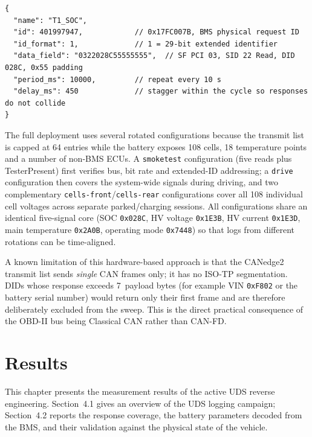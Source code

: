 \documentclass[11pt,a4paper,oneside,parskip=half]{scrreprt}
\providecommand{\hex}{}\renewcommand{\hex}[1]{\texttt{0x#1}}
\begin{document}
\begin{lstlisting}[caption={Structure of a single transmit-list entry: the SOC read (\hex{22 02 8C}) to the BMS at request ID \hex{17FC007B}, repeated every 10\,s.},label={lst:canedge_tx}]
{
  "name": "T1_SOC",
  "id": 401997947,            // 0x17FC007B, BMS physical request ID
  "id_format": 1,             // 1 = 29-bit extended identifier
  "data_field": "0322028C55555555",  // SF PCI 03, SID 22 Read, DID 028C, 0x55 padding
  "period_ms": 10000,         // repeat every 10 s
  "delay_ms": 450             // stagger within the cycle so responses do not collide
}
\end{lstlisting}

The full deployment uses several rotated configurations because the transmit list is capped at 64 entries while the battery exposes 108 cells, 18 temperature points and a number of non-BMS ECUs. A \texttt{smoketest} configuration (five reads plus TesterPresent) first verifies bus, bit rate and extended-ID addressing; a \texttt{drive} configuration then covers the system-wide signals during driving, and two complementary \texttt{cells-front}/\texttt{cells-rear} configurations cover all 108 individual cell voltages across separate parked/charging sessions. All configurations share an identical five-signal core (SOC \hex{028C}, HV voltage \hex{1E3B}, HV current \hex{1E3D}, main temperature \hex{2A0B}, operating mode \hex{7448}) so that logs from different rotations can be time-aligned.

A known limitation of this hardware-based approach is that the CANedge2 transmit list sends \emph{single} CAN frames only; it has no ISO-TP segmentation. DIDs whose response exceeds 7~payload bytes (for example VIN \hex{F802} or the battery serial number) would return only their first frame and are therefore deliberately excluded from the sweep. This is the direct practical consequence of the OBD-II bus being Classical CAN rather than CAN-FD.

\chapter{Results}
This chapter presents the measurement results of the active UDS reverse engineering. Section~4.1 gives an overview of the UDS logging campaign; Section~4.2 reports the response coverage, the battery parameters decoded from the BMS, and their validation against the physical state of the vehicle.
\end{document}
